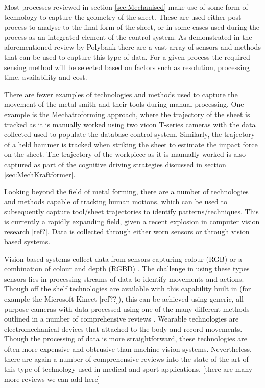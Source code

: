 Most processes reviewed in section \ref{sec:Mechanised} make use of some form of technology to capture the geometry of the sheet. These are used either post process to analyse to the final form of the sheet, or in some cases used during the process as an integrated element of the control system. As demonstrated in the aforementioned review by Polybank \citep{Allwood2016Closed-loopForming} there are a vast array of sensors and methods that can be used to capture this type of data. For a given process the required sensing method will be selected based on factors such as resolution, processing time, availability and cost. 

There are fewer examples of technologies and methods used to capture the movement of the metal smith and their tools during manual processing. One example is the Mechatroforming approach, where the trajectory of the sheet is tracked as it is manually worked  \citep{Ilangovan2016AnForming} using two vicon T-series cameras with the data collected used to populate the database control system. Similarly, the trajectory of a held hammer is tracked when striking the sheet to estimate the impact force on the sheet. The trajectory of the workpiece as it is manually worked is also captured as part of the cognitive driving strategies discussed in section \ref{sec:MechKraftformer}. 

Looking beyond the field of metal forming, there are a number of technologies and methods capable of tracking human motions, which can be used to subsequently capture tool/sheet trajectories to identify patterns/techniques. This is currently a rapidly expanding field, given a recent explosion in computer vision research [ref?]. Data is collected through either worn sensors or through vision based systems.

Vision based systems collect data from sensors capturing colour (RGB) or a combination of colour and depth (RGBD) \citep{Zhang2019AMethods}. The challenge in using these types sensors lies in processing streams of data to identify movements and actions. Though off the shelf technologies are available with this capability built in (for example the Microsoft Kinect [ref??]), this can be achieved using generic, all-purpose cameras with data processed using one of the many different methods outlined in a number of comprehensive reviews \citep{Zhang2019AMethods,Beddiar2020Vision-basedSurvey}. Wearable technologies are electromechanical devices that attached to the body and record movements. Though the processing of data is more straightforward, these technologies are often more expensive and obtrusive than machine vision systems. Nevertheless, there are again a number of comprehensive reviews into the state of the art of this type of technology used in medical \citep{Homayounfar2020WearableChallenges} and sport \citep{Taborri2020SportOverview} applications. [there are many more reviews we can add here]

